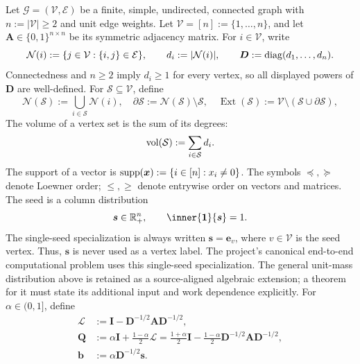 \documentclass[11pt]{article}
\begin{document}
Let \(\mathcal{G}=(\mathcal{V},\mathcal{E})\) be a finite, simple,
undirected, connected graph with \(n:=|\mathcal{V}|\geq2\) and unit edge
weights. Let \(\mathcal{V}=[n]:=\{1,\ldots,n\}\), and let
\(\bm{A}\in\{0,1\}^{n\times n}\) be its symmetric adjacency matrix. For
\(i\in\mathcal{V}\), write
\[
    \mathcal N(i):=\{j\in\mathcal{V}:\{i,j\}\in\mathcal{E}\},
    \qquad
    d_i:=|\mathcal N(i)|,
    \qquad
    \bm{D}:=\operatorname{diag}(d_1,\ldots,d_n).
\]
Connectedness and \(n\geq2\) imply \(d_i\geq1\) for every vertex, so all
displayed powers of \(\bm{D}\) are well-defined.
For \(\mathcal{S}\subseteq\mathcal{V}\), define
\[
    \mathcal N(\mathcal{S}):=\bigcup_{i\in\mathcal{S}}\mathcal N(i),
    \quad
    \partial\mathcal{S}:=\mathcal N(\mathcal{S})\setminus\mathcal{S},
    \quad
    \operatorname{Ext}(\mathcal{S}):=\mathcal{V}\setminus(\mathcal{S}\cup\partial\mathcal{S}),
\]
The volume of a vertex set is the sum of its degrees:
\begin{equation}
    \operatorname{vol}(\mathcal{S}):=\sum_{i\in\mathcal{S}}d_i.
    \label{eq:shared-volume}
\end{equation}
The support of a vector is
\(\operatorname{supp}(\bm{x}):=\{i\in[n]:x_i\neq0\}\). The symbols \(\preceq,\succeq\)
denote Loewner order; \(\leq,\geq\) denote entrywise order on vectors and
matrices. The seed is a column distribution
\begin{equation}
    \bm{s}\in\R_+^n,
    \qquad
    \inner{\one}{\bm{s}}=1.
    \label{eq:shared-seed}
\end{equation}
The single-seed specialization is always written \(\bm{s}=\bm{e}_v\), where
\(v\in\mathcal{V}\) is the seed vertex. Thus, \(\bm{s}\) is never used as a
vertex label.  The project's canonical end-to-end computational problem uses this single-seed
specialization.  The general unit-mass distribution above is retained as a
source-aligned algebraic extension; a theorem for it must state its additional
input and work dependence explicitly. For
\(\alpha\in(0,1]\), define
\begin{equation}
\begin{aligned}
    \bm{\mathcal L}&:=\bm{I}-\bm{D}^{-1/2}\bm{A}\bm{D}^{-1/2},\\
    \bm{Q}&:=\alpha\bm{I}+\frac{1-\alpha}{2}\bm{\mathcal L}
      =\frac{1+\alpha}{2}\bm{I}
       -\frac{1-\alpha}{2}\bm{D}^{-1/2}\bm{A}\bm{D}^{-1/2},\\
    \bm{b}&:=\alpha\bm{D}^{-1/2}\bm{s}.
\end{aligned}
    \label{eq:shared-pagerank-matrices}
\end{equation}
\end{document}
